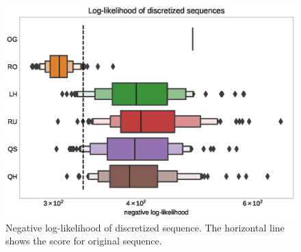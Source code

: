 \documentclass[shortabstract]{iithesis}
\begin{document}
\begin{figure}[!ht]
    \centering
    \includegraphics[scale=0.65]{gaussianHMM_example.eps}
    \caption{Negative log-likelihood of  discretized sequence. The horizontal line shows the score for original sequence.}
    \label{fig:gaussian-hmm-discrete-res}
\end{figure}

\newpage
\end{document}
